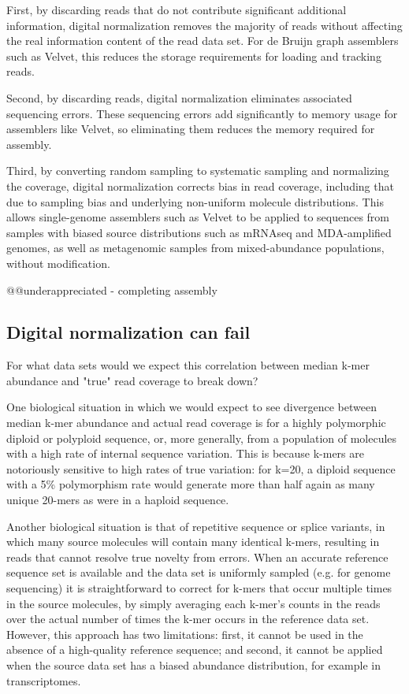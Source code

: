 \documentclass[10pt,draft]{article}
\begin{document}
First, by discarding reads that do not contribute significant
additional information, digital normalization removes the majority of
reads without affecting the real information content of the read data
set.  For de Bruijn graph assemblers such as Velvet, this reduces the
storage requirements for loading and tracking reads.

Second, by discarding reads, digital normalization eliminates
associated sequencing errors.  These sequencing errors add
significantly to memory usage for assemblers like Velvet, so
eliminating them reduces the memory required for assembly.

Third, by converting random sampling to systematic sampling and
normalizing the coverage, digital normalization corrects bias in read
coverage, including that due to sampling bias and underlying
non-uniform molecule distributions.  This allows single-genome
assemblers such as Velvet to be applied to sequences from samples with
biased source distributions such as mRNAseq and MDA-amplified genomes,
as well as metagenomic samples from mixed-abundance populations,
without modification.

@@underappreciated - completing assembly

\subsection*{Digital normalization can fail}

For what data sets would we expect this correlation between median
k-mer abundance and "true" read coverage to break down?

One biological situation in which we would expect to see divergence
between median k-mer abundance and actual read coverage is for a
highly polymorphic diploid or polyploid sequence, or, more generally,
from a population of molecules with a high rate of internal sequence
variation.  This is because k-mers are notoriously sensitive to high
rates of true variation: for k=20, a diploid sequence with a 5\%
polymorphism rate would generate more than half again as many unique
20-mers as were in a haploid sequence.

Another biological situation is that of repetitive sequence or splice
variants, in which many source molecules will contain many identical
k-mers, resulting in reads that cannot resolve true novelty from errors.  When an accurate reference sequence set is available and the
data set is uniformly sampled (e.g. for genome sequencing) it is
straightforward to correct for k-mers that occur multiple times in the
source molecules, by simply averaging each k-mer's counts in the reads
over the actual number of times the k-mer occurs in the reference data
set.  However, this approach has two limitations: first, it cannot be
used in the absence of a high-quality reference sequence; and second,
it cannot be applied when the source data set has a biased abundance
distribution, for example in transcriptomes.
\end{document}
